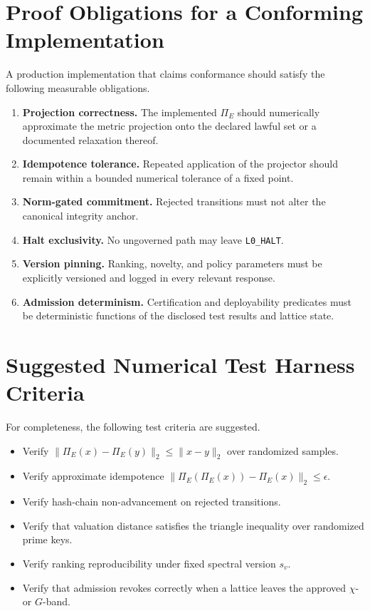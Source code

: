 \documentclass[11pt]{article}
\begin{document}
\section{Proof Obligations for a Conforming Implementation}
A production implementation that claims conformance should satisfy the following measurable obligations.
\begin{enumerate}[leftmargin=1.3cm]
  \item \textbf{Projection correctness.} The implemented \(\Pi_E\) should numerically approximate the metric projection onto the declared lawful set or a documented relaxation thereof.
  \item \textbf{Idempotence tolerance.} Repeated application of the projector should remain within a bounded numerical tolerance of a fixed point.
  \item \textbf{Norm-gated commitment.} Rejected transitions must not alter the canonical integrity anchor.
  \item \textbf{Halt exclusivity.} No ungoverned path may leave \texttt{L0\_HALT}.
  \item \textbf{Version pinning.} Ranking, novelty, and policy parameters must be explicitly versioned and logged in every relevant response.
  \item \textbf{Admission determinism.} Certification and deployability predicates must be deterministic functions of the disclosed test results and lattice state.
\end{enumerate}

\section{Suggested Numerical Test Harness Criteria}
For completeness, the following test criteria are suggested.
\begin{itemize}[leftmargin=1cm]
  \item Verify \(\|\Pi_E(x)-\Pi_E(y)\|_2 \le \|x-y\|_2\) over randomized samples.
  \item Verify approximate idempotence \(\|\Pi_E(\Pi_E(x)) - \Pi_E(x)\|_2 \le \epsilon\).
  \item Verify hash-chain non-advancement on rejected transitions.
  \item Verify that valuation distance satisfies the triangle inequality over randomized prime keys.
  \item Verify ranking reproducibility under fixed spectral version \(s_v\).
  \item Verify that admission revokes correctly when a lattice leaves the approved \(\chi\)- or \(G\)-band.
\end{itemize}
\end{document}
